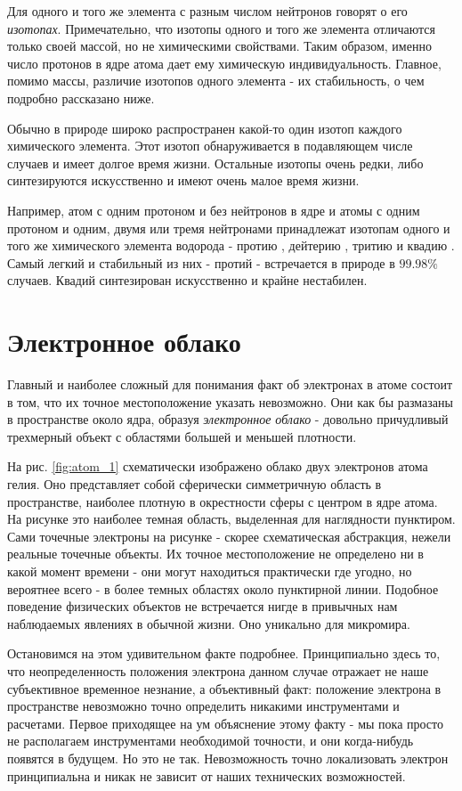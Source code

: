 Для одного и того же элемента с разным числом нейтронов говорят о его \textit{изотопах}.
Примечательно, что изотопы одного и того же элемента отличаются только своей массой, но не химическими свойствами.
Таким образом, именно число протонов в ядре атома дает ему химическую индивидуальность.
Главное, помимо массы, различие изотопов одного элемента - их стабильность, о чем подробно рассказано ниже.

Обычно в природе широко распространен какой-то один изотоп каждого химического элемента.
Этот изотоп обнаруживается в подавляющем числе случаев и имеет долгое время жизни.
Остальные изотопы очень редки, либо синтезируются искусственно и имеют очень малое время жизни. 

Например, атом с одним протоном и без нейтронов в ядре и атомы с одним протоном и одним, двумя или тремя нейтронами принадлежат изотопам одного и того же химического элемента водорода - протию , дейтерию , тритию  и квадию .
Самый легкий и стабильный из них - протий - встречается в природе в $99.98\%$ случаев.
Квадий синтезирован искусственно и крайне нестабилен.


\section*{Электронное облако}

Главный и наиболее сложный для понимания факт об электронах в атоме состоит в том, что их точное местоположение указать невозможно.
Они как бы размазаны в пространстве около ядра, образуя \textit{электронное облако} - довольно причудливый трехмерный объект с областями большей и меньшей плотности.

На рис. \ref{fig:atom_1} схематически изображено облако двух электронов атома гелия.
Оно представляет собой сферически симметричную область в пространстве, наиболее плотную в окрестности сферы с центром в ядре атома.
На рисунке это наиболее темная область, выделенная для наглядности пунктиром.
Сами точечные электроны на рисунке - скорее схематическая абстракция, нежели реальные точечные объекты.
Их точное местоположение не определено ни в какой момент времени - они могут находиться практически где угодно, но вероятнее всего - в более темных областях около пунктирной линии.
Подобное поведение физических объектов не встречается нигде в привычных нам наблюдаемых явлениях в обычной жизни.
Оно уникально для микромира. 

Остановимся на этом удивительном факте подробнее.
Принципиально здесь то, что неопределенность положения электрона данном случае отражает не наше субъективное временное незнание, а объективный факт: положение электрона в пространстве невозможно точно определить никакими инструментами и расчетами.
Первое приходящее на ум объяснение этому факту - мы пока просто не располагаем инструментами необходимой точности, и они когда-нибудь появятся в будущем.
Но это не так.
Невозможность точно локализовать электрон принципиальна и никак не зависит от наших технических возможностей.

